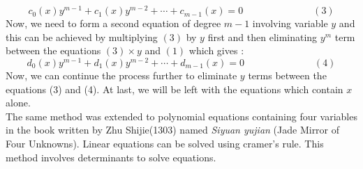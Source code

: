 \documentclass[a4paper,reqno,11pt]{book}
\theoremstyle{plain}%
\theoremstyle{definition}
\begin{document}
$$c_{0}(x)y^{m-1} + c_{1}(x)y^{m-2} + \cdots + c_{m-1}(x) = 0 \hspace{3cm} (3)$$
Now, we need to form a second equation of degree $m−1$ involving variable $y$ and this can be achieved by multiplying $(3)$ by
$y$ first and then eliminating $y^m$ term between the equations $(3) \times y$ and $(1)$ which gives :\\
$$d_{0}(x)y^{m-1} + d_{1}(x)y^{m-2} + \cdots + d_{m-1}(x) = 0 \hspace{3cm} (4)$$
Now, we can continue the process further to eliminate $y$ terms between the equations (3) and (4). At last, we will be left with the equations which contain $x$ alone.\\ \indent The same method
was extended to polynomial equations containing four variables in the book written by Zhu Shijie(1303) named
\textit{Siyuan yujian} (Jade Mirror of Four Unknowns).
Linear equations can be solved using cramer's rule. This method involves determinants to solve equations.\\
\\
\end{document}
